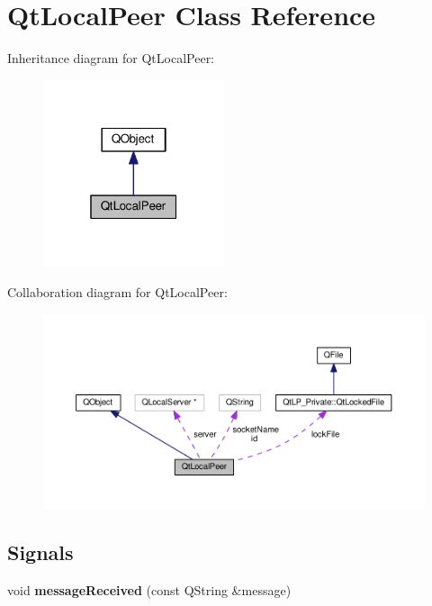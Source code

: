 \hypertarget{class_qt_local_peer}{}\section{Qt\+Local\+Peer Class Reference}
\label{class_qt_local_peer}


Inheritance diagram for Qt\+Local\+Peer\+:\nopagebreak
\begin{figure}[H]
\begin{center}
\leavevmode
\includegraphics[width=151pt]{class_qt_local_peer__inherit__graph}
\end{center}
\end{figure}


Collaboration diagram for Qt\+Local\+Peer\+:\nopagebreak
\begin{figure}[H]
\begin{center}
\leavevmode
\includegraphics[width=350pt]{class_qt_local_peer__coll__graph}
\end{center}
\end{figure}
\subsection*{Signals}
\begin{DoxyCompactItemize}
\item 
void {\bfseries message\+Received} (const Q\+String \&message)\hypertarget{class_qt_local_peer_a4436ad976edb6f177de1300b5aab9bfe}{}\label{class_qt_local_peer_a4436ad976edb6f177de1300b5aab9bfe}

\end{DoxyCompactItemize}
